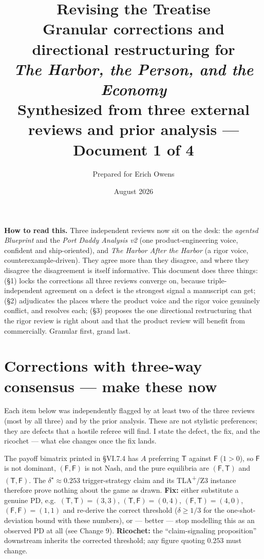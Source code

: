 \documentclass[11pt,a4paper]{article}
\title{\textbf{Revising the Treatise}\\[4pt]
\large Granular corrections and directional restructuring for\\ \emph{The Harbor, the Person, and the Economy}\\[3pt]
\normalsize Synthesized from three external reviews and prior analysis --- Document 1 of 4}
\author{Prepared for Erich Owens}
\date{August 2026}
\begin{document}
\maketitle

\noindent\textbf{How to read this.} Three independent reviews now sit on the desk: the \emph{agentsd Blueprint} and the \emph{Port Daddy Analysis v2} (one product-engineering voice, confident and ship-oriented), and \emph{The Harbor After the Harbor} (a rigor voice, counterexample-driven). They agree more than they disagree, and where they disagree the disagreement is itself informative. This document does three things: (\S1) locks the corrections all three reviews converge on, because triple-independent agreement on a defect is the strongest signal a manuscript can get; (\S2) adjudicates the places where the product voice and the rigor voice genuinely conflict, and resolves each; (\S3) proposes the one directional restructuring that the rigor review is right about and that the product review will benefit from commercially. Granular first, grand last.

\section{Corrections with three-way consensus --- make these now}
Each item below was independently flagged by at least two of the three reviews (most by all three) and by the prior analysis. These are not stylistic preferences; they are defects that a hostile referee will find. I state the defect, the fix, and the ricochet --- what else changes once the fix lands.

\begin{change}
The payoff bimatrix printed in \S VI.7.4 has $A$ preferring $\mathsf{T}$ against $\mathsf{F}$ ($1>0$), so $\mathsf{F}$ is not dominant, $(\mathsf{F},\mathsf{F})$ is not Nash, and the pure equilibria are $(\mathsf{F},\mathsf{T})$ and $(\mathsf{T},\mathsf{F})$. The $\delta^\star\!\approx\!0.253$ trigger-strategy claim and its TLA\textsuperscript{+}/Z3 instance therefore prove nothing about the game as drawn. \textbf{Fix:} either substitute a genuine PD, e.g.\ $(\mathsf{T},\mathsf{T})\!=\!(3,3)$, $(\mathsf{T},\mathsf{F})\!=\!(0,4)$, $(\mathsf{F},\mathsf{T})\!=\!(4,0)$, $(\mathsf{F},\mathsf{F})\!=\!(1,1)$ and re-derive the correct threshold ($\delta \ge 1/3$ for the one-shot-deviation bound with these numbers), or --- better --- stop modelling this as an observed PD at all (see Change 9). \textbf{Ricochet:} the ``claim-signaling proposition'' downstream inherits the corrected threshold; any figure quoting $0.253$ must change.
\end{change}
\end{document}
